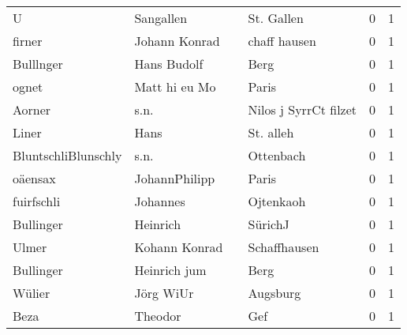 \begin{center}
\begin{tiny}
\begin{longtabu}{llllrr}
                        U &                          Sangallen &             &                                  St. Gallen &          0 &         1 \\
                   firner &                      Johann Konrad &             &                                chaff hausen &          0 &         1 \\
                Bulllnger &                        Hans Budolf &             &                                        Berg &          0 &         1 \\
                    ognet &                      Matt hi eu Mo &             &                                       Paris &          0 &         1 \\
                   Aorner &                               s.n. &             &                       Nilos j SyrrCt filzet &          0 &         1 \\
                    Liner &                               Hans &             &                                   St. alleh &          0 &         1 \\
      BluntschliBlunschly &                               s.n. &             &                                   Ottenbach &          0 &         1 \\
                  oäensax &                      JohannPhilipp &             &                                       Paris &          0 &         1 \\
               fuirfschli &                           Johannes &             &                                   Ojtenkaoh &          0 &         1 \\
                Bullinger &                           Heinrich &             &                                     SürichJ &          0 &         1 \\
                    Ulmer &                      Kohann Konrad &             &                                Schaffhausen &          0 &         1 \\
                Bullinger &                       Heinrich jum &             &                                        Berg &          0 &         1 \\
                   Wülier &                          Jörg WiUr &             &                                    Augsburg &          0 &         1 \\
                     Beza &                            Theodor &             &                                         Gef &          0 &         1 \\

\end{longtabu}
\end{tiny}
\end{center}
